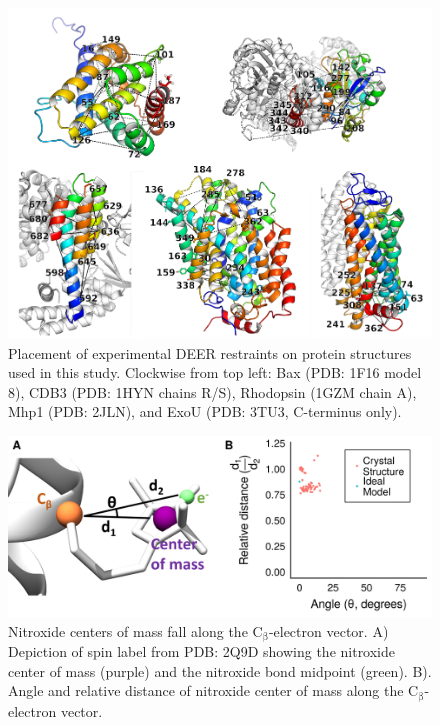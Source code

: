 \begin{figure}[h]
\centering
\includegraphics[width=5.5in]{Figures/rosettadeer_supp_restraints.pdf}
 \caption[Placement of experimental DEER restraints on protein structures used in this study.]{Placement of experimental DEER restraints on protein structures used in this study. Clockwise from top left: Bax (PDB: 1F16 model 8), CDB3 (PDB: 1HYN chains R/S), Rhodopsin (1GZM chain A), Mhp1 (PDB: 2JLN), and ExoU (PDB: 3TU3, C-terminus only).}
\label{fig:rosettadeer_supp_restraints}
\end{figure}

\begin{figure}[h]
\centering
\includegraphics[width=6in]{Figures/rosettadeer_supp_sl.pdf}
 \caption[Nitroxide centers of mass fall along the $\mathrm{C_{\upbeta}}$-electron vector.]{Nitroxide centers of mass fall along the $\mathrm{C_{\upbeta}}$-electron vector. A) Depiction of spin label from PDB: 2Q9D showing the nitroxide center of mass (purple) and the nitroxide bond midpoint (green). B). Angle and relative distance of nitroxide center of mass along the $\mathrm{C_{\upbeta}}$-electron vector.}
\label{fig:rosettadeer_supp_sl}
\end{figure}

